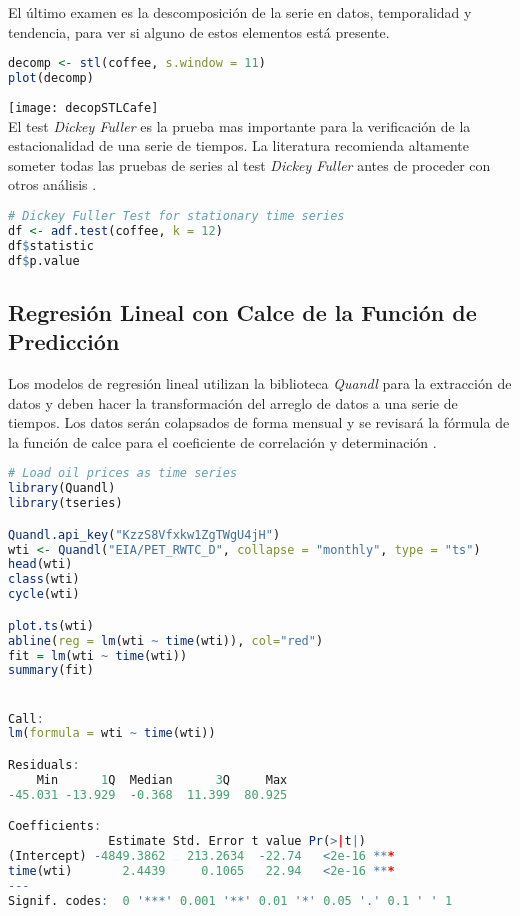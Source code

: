 \begin{spacing}{1.5}
El último examen es la descomposición de la serie en datos, temporalidad y tendencia, para ver si alguno de estos elementos está presente.

\begin{lstlisting}[language=R]
decomp <- stl(coffee, s.window = 11)
plot(decomp)
\end{lstlisting}

\texttt{[image: decopSTLCafe]}\\

El test \emph{Dickey Fuller} \cite{dickeyfuller} es la prueba mas importante para la verificación de la estacionalidad de una serie de tiempos. La literatura recomienda altamente someter todas las pruebas de series al test \emph{Dickey Fuller} antes de proceder con otros análisis \cite{hyndman}.

\begin{lstlisting}[language=R]
# Dickey Fuller Test for stationary time series
df <- adf.test(coffee, k = 12)
df$statistic
df$p.value
\end{lstlisting}

\subsection{Regresión Lineal con Calce de la Función de Predicción}
Los modelos de regresión lineal utilizan la biblioteca \emph{Quandl} para la extracción de datos y deben hacer la transformación del arreglo de datos a una serie de tiempos. Los datos serán colapsados de forma mensual y se revisará la fórmula de la función de calce para el coeficiente de correlación y determinación \cite{narayanachar}. 

\begin{lstlisting}[language=R]
# Load oil prices as time series
library(Quandl)
library(tseries)

Quandl.api_key("KzzS8Vfxkw1ZgTWgU4jH")
wti <- Quandl("EIA/PET_RWTC_D", collapse = "monthly", type = "ts")
head(wti)
class(wti)
cycle(wti)

plot.ts(wti)
abline(reg = lm(wti ~ time(wti)), col="red")
fit = lm(wti ~ time(wti))
summary(fit)


Call:
lm(formula = wti ~ time(wti))

Residuals:
    Min      1Q  Median      3Q     Max 
-45.031 -13.929  -0.368  11.399  80.925 

Coefficients:
              Estimate Std. Error t value Pr(>|t|)    
(Intercept) -4849.3862   213.2634  -22.74   <2e-16 ***
time(wti)       2.4439     0.1065   22.94   <2e-16 ***
---
Signif. codes:  0 '***' 0.001 '**' 0.01 '*' 0.05 '.' 0.1 ' ' 1


\end{lstlisting}
\end{spacing}

